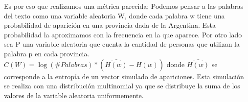 Es por eso que realizamos una métrica parecida:
Podemos pensar a las palabras del texto como una variable aleatoria W, donde cada palabra w tiene una probabilidad de aparición en una provincia dada de la Argentina. Esta probabilidad la aproximamos con la frecuencia en la que aparece.
Por otro lado sea P una variable aleatoria que cuenta la cantidad de personas que 
utilizan la palabra p en cada provincia.
$C(W) = \log(\#Palabras) * (\widehat{ H(w)} -  H(w)) $  donde
$\widehat{H(w)}$ se corresponde a la entropía de un vector simulado de apariciones.
Esta simulación se realiza con una distribución multinomial ya que se distribuye la 
suma de los valores de la variable aleatoria uniformemente. 



%

